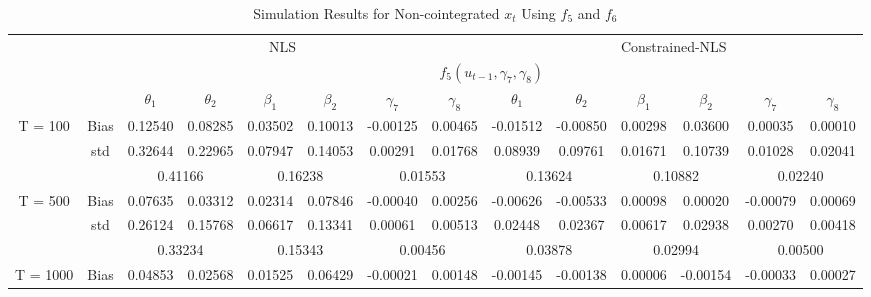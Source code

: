 \documentclass[a4paper,12pt,times,numbered,print,index]{report}
\numberwithin{equation}{section}
\begin{document}
\begin{table}[htbp]
	\centering
	\caption{Simulation Results for Non-cointegrated $x_t$ Using $f_5$ and $f_6$}
	\begin{adjustbox}{max width=\textwidth}
	\begin{tabular}{cccccccccccccc}
		\toprule
		& \multicolumn{7}{c}{NLS}                               & \multicolumn{6}{c}{Constrained-NLS} \\
		&       & \multicolumn{12}{c}{$f_5 (u_{t-1}, \gamma_7, \gamma_8)$} \\
		&       & $\theta_1$ & $\theta_2$ & $\beta_1$ & $\beta_2$ & $\gamma_7$ & $\gamma_{8}$ & $\theta_1$ & $\theta_2$ & $\beta_1$ & $\beta_2$ & $\gamma_7$ & $\gamma_{8}$ \\
		\midrule
		T = 100 & Bias  & \textcolor[rgb]{ .184,  .459,  .71}{0.12540} & 0.08285 & 0.03502 & 0.10013 & -0.00125 & 0.00465 & \textcolor[rgb]{ .184,  .459,  .71}{-0.01512} & -0.00850 & 0.00298 & 0.03600 & 0.00035 & 0.00010 \\
		& std   & 0.32644 & 0.22965 & 0.07947 & 0.14053 & 0.00291 & 0.01768 & 0.08939 & 0.09761 & 0.01671 & 0.10739 & 0.01028 & 0.02041 \\
		&       & \multicolumn{2}{c}{0.41166} & \multicolumn{2}{c}{0.16238} & \multicolumn{2}{c}{0.01553} & \multicolumn{2}{c}{0.13624} & \multicolumn{2}{c}{0.10882} & \multicolumn{2}{c}{0.02240} \\
		\multirow{3}[0]{*}{T = 500} & Bias  & \textcolor[rgb]{ .184,  .459,  .71}{0.07635} & 0.03312 & 0.02314 & 0.07846 & -0.00040 & 0.00256 & \textcolor[rgb]{ .184,  .459,  .71}{-0.00626} & -0.00533 & 0.00098 & 0.00020 & -0.00079 & 0.00069 \\
		& std   & 0.26124 & 0.15768 & 0.06617 & 0.13341 & 0.00061 & 0.00513 & 0.02448 & 0.02367 & 0.00617 & 0.02938 & 0.00270 & 0.00418 \\
		&       & \multicolumn{2}{c}{0.33234} & \multicolumn{2}{c}{0.15343} & \multicolumn{2}{c}{0.00456} & \multicolumn{2}{c}{0.03878} & \multicolumn{2}{c}{0.02994} & \multicolumn{2}{c}{0.00500} \\
		\multirow{3}[1]{*}{T = 1000} & Bias  & \textcolor[rgb]{ .184,  .459,  .71}{0.04853} & 0.02568 & 0.01525 & 0.06429 & -0.00021 & 0.00148 & \textcolor[rgb]{ .184,  .459,  .71}{-0.00145} & -0.00138 & 0.00006 & -0.00154 & -0.00033 & 0.00027 \\

\end{tabular}
\end{adjustbox}
\end{table}
\end{document}

